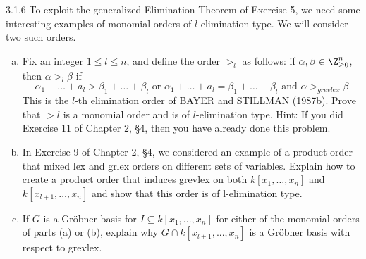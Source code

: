 \documentclass[twoside]{article}
\begin{document}
\begin{ejercicio}{3.1.6}
To exploit the generalized Elimination Theorem of Exercise 5, we need some interesting examples of monomial orders of $l$-elimination type. We will consider two such orders.
\begin{enumerate}[a.]
\item Fix an integer $1\leq l \leq n$, and define the order $>_l$ as follows: if $\alpha,\beta \in \Z_{\geq 0}^n$, then $\alpha>_l\beta$ if
$$
\alpha_1 + \dotsc + a_l > \beta_1 + \dotsc + \beta_l \text{ or } \alpha_1 + \dotsc + a_l = \beta_1 + \dotsc + \beta_l \text{ and } \alpha >_{grevlex} \beta
$$
This is the $l$-th elimination order of BAYER and STILLMAN (1987b). Prove that $>l$ is a monomial order and is of $l$-elimination type. Hint: If you did Exercise 11 of Chapter 2,
§4, then you have already done this problem.
\item In Exercise 9 of Chapter 2, §4, we considered an example of a product order that mixed lex and grlex orders on different sets of variables. Explain how to create a product order that induces grevlex on both $k[x_{1},\dotsc, x_n]$ and $k[x_{l+1},\dotsc, x_n]$ and show that this order
is of l-elimination type.
\item If $G$ is a Gröbner basis for $I ⊆ k[x_1, . . . , x_n]$ for either of the monomial orders of parts (a) or (b), explain why $G ∩ k[x_{l+1}, . . . , x_n]$ is a Gröbner basis with respect to grevlex.
\end{enumerate}
\end{ejercicio}
\end{document}
